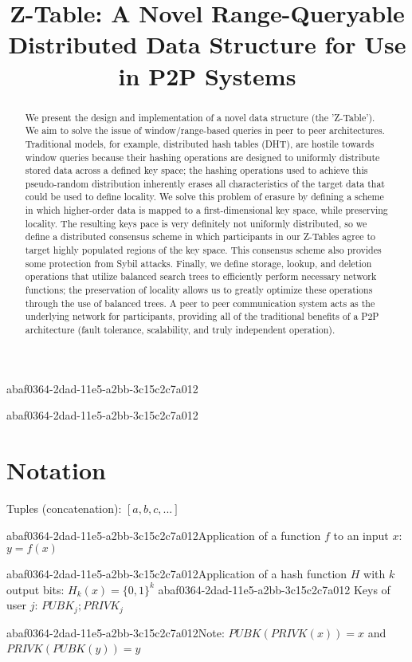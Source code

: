 \documentclass[12pt]{article}
\title{Z-Table: A Novel Range-Queryable Distributed Data Structure for Use in P2P Systems}
\begin{document}
abaf0364-2dad-11e5-a2bb-3c15c2c7a012
\maketitle

abaf0364-2dad-11e5-a2bb-3c15c2c7a012\begin{abstract}
We present the design and implementation of a novel data structure (the 'Z-Table'). We aim to solve the issue of window/range-based queries in peer to peer architectures. Traditional models, for example,  distributed hash tables (DHT), are hostile towards window queries because their hashing operations are designed to uniformly distribute stored data across a defined key space; the hashing operations used to achieve this pseudo-random distribution inherently erases all characteristics of the target data that could be used to define locality. We solve this problem of erasure by defining a scheme in which higher-order data is mapped to a first-dimensional key space, while preserving locality. The resulting keys pace is very definitely not uniformly distributed, so we define a distributed consensus scheme in which participants in our Z-Tables agree to target highly populated regions of the key space. This consensus scheme also provides some protection from Sybil attacks. Finally, we define storage, lookup, and deletion operations that utilize balanced search trees to efficiently perform necessary network functions; the preservation of locality allows us to greatly optimize these operations through the use of balanced trees. A peer to peer communication system acts as the underlying network for participants, providing all of the traditional benefits of a P2P architecture (fault tolerance, scalability, and truly independent operation).
\end{abstract}

\section{Notation}

Tuples (concatenation): $[a,b,c,...]$

abaf0364-2dad-11e5-a2bb-3c15c2c7a012Application of a function $f$ to an input $x$: $y=f(x)$

abaf0364-2dad-11e5-a2bb-3c15c2c7a012Application of a hash function $H$ with $k$ output bits: $H_{k}(x) = \{0,1\}^k$
abaf0364-2dad-11e5-a2bb-3c15c2c7a012
Keys of user $j$: $ PUBK_j; PRIVK_j $

abaf0364-2dad-11e5-a2bb-3c15c2c7a012Note: $PUBK(PRIVK(x)) = x$ and $PRIVK(PUBK(y)) = y$~
\end{document}
